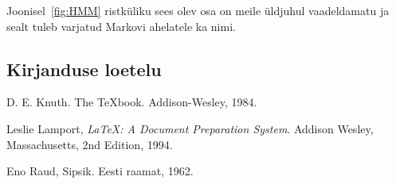 Joonisel~\ref{fig:HMM} ristküliku sees olev osa on meile üldjuhul vaadeldamatu ja sealt tuleb varjatud Markovi ahelatele ka nimi.

\subsection{Kirjanduse loetelu}

\begin{thebibliography}{99}

 D. E. Knuth. The {\TeX}book.
Addison-Wesley, 1984.

 Leslie Lamport,
	\emph{\LaTeX: A Document Preparation System}.
	Addison Wesley, Massachusetts,
	2nd Edition,
	1994.

 Eno Raud,
  Sipsik.
  Eesti raamat,
  1962.
\end{thebibliography}
